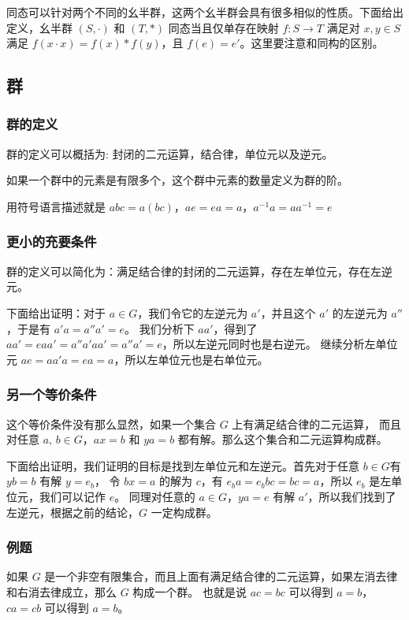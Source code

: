 同态可以针对两个不同的幺半群，这两个幺半群会具有很多相似的性质。下面给出定义，幺半群 $(S, \cdot)$ 和 $(T, *)$ 同态当且仅单存在映射 $f: S \to T$
满足对 $x,y \in S $ 满足 $f(x \cdot x) = f(x) * f(y)$，且 $f(e) = e'$。这里要注意和同构的区别。

\subsection{群}

\subsubsection{群的定义}

群的定义可以概括为: 封闭的二元运算，结合律，单位元以及逆元。

如果一个群中的元素是有限多个，这个群中元素的数量定义为群的阶。

用符号语言描述就是 $abc = a(bc)$，$ae = ea = a$，$a^{-1}a = aa^{-1} = e$

\subsubsection{更小的充要条件}

群的定义可以简化为：满足结合律的封闭的二元运算，存在左单位元，存在左逆元。

下面给出证明：对于 $a \in G$，我们令它的左逆元为 $a'$，并且这个 $a'$ 的左逆元为 $a''$，于是有 $a'a = a''a'= e$。
我们分析下 $aa'$，得到了 $aa' = eaa' = a''a'aa' = a''a' = e$，所以左逆元同时也是右逆元。
继续分析左单位元 $ae = aa'a = ea = a$，所以左单位元也是右单位元。

\subsubsection{另一个等价条件}

这个等价条件没有那么显然，如果一个集合 $G$ 上有满足结合律的二元运算，
而且对任意 $a,\,b \in G$，$ax = b$ 和 $ya  = b$ 都有解。那么这个集合和二元运算构成群。

下面给出证明，我们证明的目标是找到左单位元和左逆元。首先对于任意 $b \in G$有 $yb = b$ 有解 $y = e_b$，
令 $bx = a$ 的解为 $c$，有 $e_ba = e_bbc = bc =  a$，所以 $e_b$ 是左单位元，我们可以记作 $e$。
同理对任意的 $a \in G$，$ya = e$ 有解 $a'$，所以我们找到了左逆元，根据之前的结论，$G$ 一定构成群。

\subsubsection{例题}
如果 $G$ 是一个非空有限集合，而且上面有满足结合律的二元运算，如果左消去律和右消去律成立，那么 $G$ 构成一个群。
也就是说 $ac = bc$ 可以得到 $a = b$，$ca= cb$ 可以得到 $a = b$。

